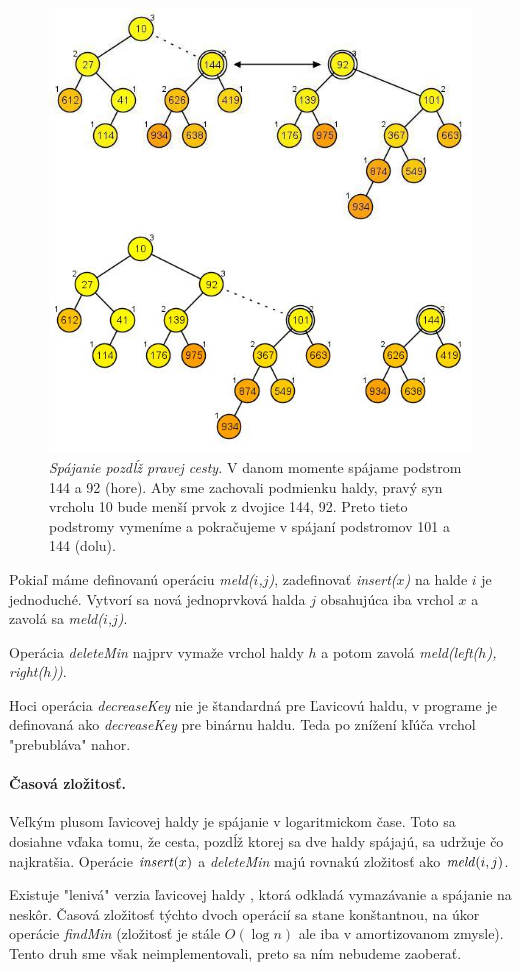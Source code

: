 \begin{figure}
\includegraphics[width=\columnwidth]{obrazky/leftistmeld.png}
\caption{\emph{Spájanie pozdĺž pravej cesty.} V danom momente spájame podstrom 144 a 92 (hore).
Aby sme zachovali podmienku haldy, pravý syn vrcholu 10 bude menší prvok z dvojice 144, 92.
Preto tieto podstromy vymeníme a pokračujeme v spájaní podstromov 101 a 144 (dolu).} 
\label{img:leftmeld} 
\end{figure}

Pokiaľ máme definovanú operáciu \emph{meld($i$,$j$)}, zadefinovať \emph{insert($x$)} na halde $i$ je jednoduché. Vytvorí sa nová jednoprvková halda $j$ obsahujúca iba vrchol $x$ a zavolá sa \emph{meld($i$,$j$)}.

Operácia \emph{deleteMin} najprv vymaže vrchol haldy $h$ a potom zavolá \emph{meld(left($h$), right($h$))}.

Hoci operácia \emph{decreaseKey} nie je štandardná pre Ľavicovú haldu, v programe je definovaná ako \emph{decreaseKey} pre 
binárnu haldu. Teda po znížení kľúča vrchol "prebubláva" nahor.

\paragraph{Časová zložitosť.}
Veľkým plusom ľavicovej haldy je spájanie v logaritmickom čase. 
Toto sa dosiahne vďaka tomu, že cesta, pozdĺž ktorej sa dve haldy spájajú, sa udržuje čo 
najkratšia. Operácie $\mathop{\mathit{insert}}(x)$ a \emph{deleteMin} majú rovnakú zložitosť ako $\mathop{\mathit{meld}}(i,j)$.

Existuje "lenivá" verzia ľavicovej haldy \citep{left}, ktorá odkladá vymazávanie a spájanie na neskôr.
Časová zložitosť týchto dvoch operácií sa stane konštantnou, na úkor operácie \emph{findMin} (zložitosť
je stále $O(\log n)$ ale iba v amortizovanom zmysle).
Tento druh sme však neimplementovali, preto sa ním nebudeme zaoberať.
